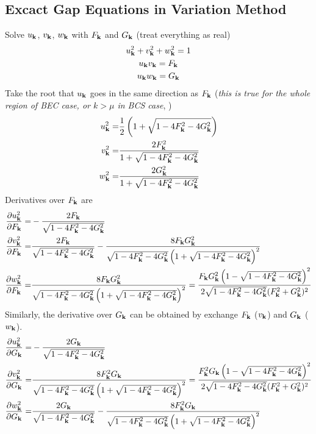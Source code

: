 \subsection{Excact Gap Equations in Variation Method}
Solve $u_{\mathbf{k}}$, $v_{\mathbf{k}}$, $w_{\mathbf{k}}$ with $F_{\mathbf{k}}$ and $G_{\mathbf{k}}$ (treat everything as real)
\begin{gather}
u_{\mathbf{k}}^2+v^{2}_{\mathbf{k}}+w^{2}_{\mathbf{k}}=1\\
u_{\mathbf{k}}v_{\mathbf{k}}=F_{\mathbf{k}}\\
u_{\mathbf{k}}w_{\mathbf{k}}=G_{\mathbf{k}}
\end{gather}
Take the root that $u_{\mathbf{k}}$ goes in the same direction as $F_{\mathbf{k}}$  (\emph{this is true for the whole region of BEC case, or $k>\mu$ in BCS case}, )
\begin{equation}
\begin{split}
u_{\mathbf{k}}^2=&\frac{1}{2} \left(1+\sqrt{1-4 F_{\mathbf{k}}^2-4 G_{\mathbf{k}}^2}\right)\\
v^{2}_{\mathbf{k}}=&\frac{2 F_{\mathbf{k}}^2}{1+\sqrt{1-4 F_{\mathbf{k}}^2-4 G_{\mathbf{k}}^2}}\\
w^{2}_{\mathbf{k}}=&\frac{2 G_{\mathbf{k}}^2}{1+\sqrt{1-4 F_{\mathbf{k}}^2-4 G_{\mathbf{k}}^2}}
\end{split}
\end{equation}
Derivatives over $F_{\mathbf{k}}$ are
\begin{equation}
\begin{split}
\frac{\partial{u_{\ensuremath{\mathbf{k}}}^2}}{\partial{F_{\ensuremath{\mathbf{k}}}}}=&-\frac{2 F_{\mathbf{k}}}{\sqrt{1-4 F_{\mathbf{k}}^2-4 G_{\mathbf{k}}^2}}\\
\frac{\partial{v_{\ensuremath{\mathbf{k}}}^2}}{\partial{F_{\ensuremath{\mathbf{k}}}}}=&\frac{2 F_{\mathbf{k}}}{\sqrt{1-4 F_{\mathbf{k}}^2-4 G_{\mathbf{k}}^2}}-\frac{8 F_{\mathbf{k}} G_{\mathbf{k}}^2}{\sqrt{1-4 F_{\mathbf{k}}^2-4 G_{\mathbf{k}}^2} \left(1+\sqrt{1-4 F_{\mathbf{k}}^2-4 G_{\mathbf{k}}^2}\right)^2}\\
\frac{\partial{w_{\ensuremath{\mathbf{k}}}^2}}{\partial{F_{\ensuremath{\mathbf{k}}}}}=&\frac{8 F_{\mathbf{k}} G_{\mathbf{k}}^2}{\sqrt{1-4 F_{\mathbf{k}}^2-4 G_{\mathbf{k}}^2} \left(1+\sqrt{1-4 F_{\mathbf{k}}^2-4 G_{\mathbf{k}}^2}\right)^2}
=\frac{F_{\mathbf{k}} G_{\mathbf{k}}^2 \left(1-\sqrt{1-4 F_{\mathbf{k}}^2-4 G_{\mathbf{k}}^2}\right)^2}{2\sqrt{1-4 F_{\mathbf{k}}^2-4 G_{\mathbf{k}}^2} (F_{\mathbf{k}}^2 + G_{\mathbf{k}}^2)^2}
\end{split}
\end{equation}
Similarly, the derivative over $G_{\mathbf{k}}$ can be obtained by exchange $F_{\mathbf{k}}$ ($v_{\mathbf{k}}$) and $G_{\mathbf{k}}$ ($w_{\mathbf{k}}$).
\begin{equation}
\begin{split}
\frac{\partial{u_{\ensuremath{\mathbf{k}}}^2}}{\partial{G_{\ensuremath{\mathbf{k}}}}}=&-\frac{2 G_{\mathbf{k}}}{\sqrt{1-4 F_{\mathbf{k}}^2-4 G_{\mathbf{k}}^2}}\\
\frac{\partial{v_{\ensuremath{\mathbf{k}}}^2}}{\partial{G_{\ensuremath{\mathbf{k}}}}}=&\frac{8 F_{\mathbf{k}} ^{2}G_{\mathbf{k}}}{\sqrt{1-4 F_{\mathbf{k}}^2-4 G_{\mathbf{k}}^2} \left(1+\sqrt{1-4 F_{\mathbf{k}}^2-4 G_{\mathbf{k}}^2}\right)^2}
=\frac{F_{\mathbf{k}}^{2}G_{\mathbf{k}} \left(1-\sqrt{1-4 F_{\mathbf{k}}^2-4 G_{\mathbf{k}}^2}\right)^2}{2\sqrt{1-4 F_{\mathbf{k}}^2-4 G_{\mathbf{k}}^2} (F_{\mathbf{k}}^2 + G_{\mathbf{k}}^2)^2}\\
\frac{\partial{w_{\ensuremath{\mathbf{k}}}^2}}{\partial{G_{\ensuremath{\mathbf{k}}}}}=&\frac{2 G_{\mathbf{k}}}{\sqrt{1-4 F_{\mathbf{k}}^2-4 G_{\mathbf{k}}^2}}-\frac{8 F_{\mathbf{k}} ^{2}G_{\mathbf{k}}}{\sqrt{1-4 F_{\mathbf{k}}^2-4 G_{\mathbf{k}}^2} \left(1+\sqrt{1-4 F_{\mathbf{k}}^2-4 G_{\mathbf{k}}^2}\right)^2}
\end{split}
\end{equation}
